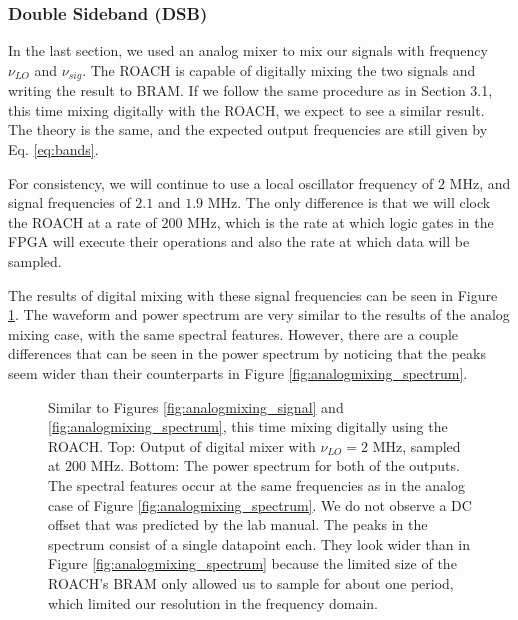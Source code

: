 \documentclass[12pt]{article}
\begin{document}
\subsubsection{Double Sideband (DSB)}
In the last section, we used an analog mixer to mix our signals with frequency $\nu_{LO}$ and $\nu_{sig}$. The ROACH is capable of digitally mixing the two signals and writing the result to BRAM. If we follow the same procedure as in Section 3.1, this time mixing digitally with the ROACH, we expect to see a similar result. The theory is the same, and the expected output frequencies are still given by Eq. \ref{eq:bands}.

For consistency, we will continue to use a local oscillator frequency of $2$ MHz, and signal frequencies of $2.1$ and $1.9$ MHz. The only difference is that we will clock the ROACH at a rate of $200$ MHz, which is the rate at which logic gates in the FPGA will execute their operations and also the rate at which data will be sampled.

The results of digital mixing with these signal frequencies can be seen in Figure \ref{fig:digitalmixing}. The waveform and power spectrum are very similar to the results of the analog mixing case, with the same spectral features. However, there are a couple differences that can be seen in the power spectrum by noticing that the peaks seem wider than their counterparts in Figure \ref{fig:analogmixing_spectrum}.

\begin{figure}[H]
\caption[SODUMB]{Similar to Figures \ref{fig:analogmixing_signal} and \ref{fig:analogmixing_spectrum}, this time mixing digitally using the ROACH. Top: Output of digital mixer with $\nu_{LO}=2$ MHz, sampled at $200$ MHz.  Bottom: The power spectrum for both of the outputs. The spectral features occur at the same frequencies as in the analog case of Figure \ref{fig:analogmixing_spectrum}.  We do not observe a DC offset that was predicted by the lab manual. The peaks in the spectrum consist of a single datapoint each. They look wider than in Figure \ref{fig:analogmixing_spectrum} because the limited size of the ROACH's BRAM only allowed us to sample for about one period, which limited our resolution in the frequency domain.}
\label{fig:digitalmixing}
\end{figure}
\end{document}
